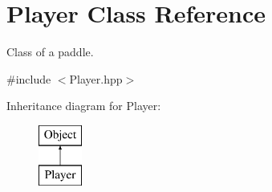 \hypertarget{class_player}{}\section{Player Class Reference}
\label{class_player}


Class of a paddle.  




{\ttfamily \#include $<$Player.\+hpp$>$}

Inheritance diagram for Player\+:\begin{figure}[H]
\begin{center}
\leavevmode
\includegraphics[height=2.000000cm]{class_player}
\end{center}
\end{figure}
